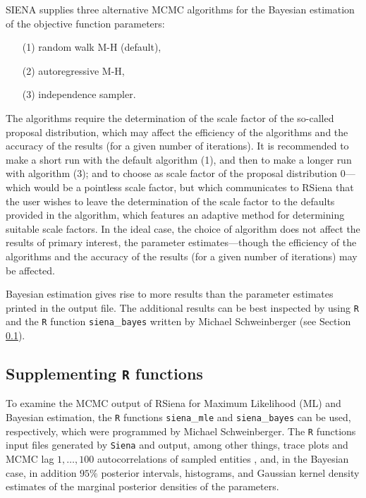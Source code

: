 \documentclass[a4paper,fleqn,11pt]{article}
\newcommand{\+}{\, + \,}
\newcommand{\RS}{{\sf \textsf{RSiena} }}
\newcommand{\SI}{{\sf SIENA }}
\begin{document}
\iffalse
\SI supplies three alternative MCMC algorithms for the
Bayesian estimation of the objective function parameters:
\begin{itemize}
\item[(1)] random walk M-H (default),
\item[(2)] autoregressive M-H,
\item[(3)] independence sampler.
\end{itemize}
The algorithms require the determination of the scale factor of
the so-called proposal distribution, which may affect the efficiency
of the algorithms and the accuracy of the results (for a given number of iterations).
It is recommended to make a short run with the default algorithm (1),
and then to make a longer run with algorithm (3);
and to choose as scale factor of the proposal
distribution $0$---which would be a pointless scale factor,
but which communicates to \RS that the user wishes to
leave the determination of the scale factor to the defaults provided in the algorithm,
which features an adaptive method for determining suitable
scale factors.
In the ideal case, the choice of algorithm does not affect the
results of primary interest, the parameter estimates---though the
efficiency of the algorithms and the accuracy of the results (for a
given number of iterations) may be affected.

Bayesian estimation gives rise to more results than the parameter
estimates printed in the output file.
The additional results can be best inspected by using {\tt R} and the
{\tt R} function {\tt siena}\_{\tt bayes} written by Michael
Schweinberger (see Section \ref{R_functions}).

\subsection{Supplementing {\tt R} functions}
\label{R_functions}

To examine the MCMC output of \RS for Maximum Likelihood (ML) and Bayesian estimation,
the {\tt R} functions {\tt siena}\_{\tt mle} and {\tt siena}\_{\tt bayes} can be used,
respectively,
which were programmed by Michael Schweinberger.
The {\tt R} functions input files generated by {\tt Siena} and output,
among other things,
trace plots and MCMC lag $1, \dots, 100$ autocorrelations of sampled entities
\citep[see][]{SchweinbergerSnijders07b, SchweinbergerSnijders07c},
and,
in the Bayesian case,
in addition $95\%$ posterior intervals, histograms, and Gaussian kernel density
estimates of the marginal posterior densities of the parameters.
\end{document}
